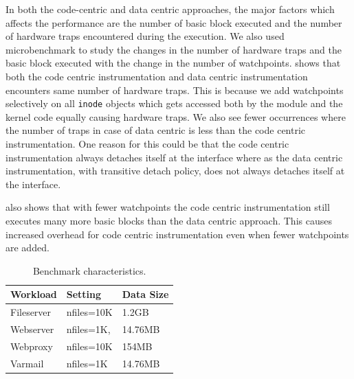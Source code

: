 In both the code-centric and data centric approaches, the major factors which affects the performance are the number of basic block executed and the number of hardware traps encountered during the execution. We also used microbenchmark to study the changes in the number of hardware traps and the basic block executed with the change in the number of watchpoints.  shows that both the code centric instrumentation and data centric instrumentation encounters same number of hardware traps. This is because we add watchpoints selectively on all \texttt{inode} objects which gets accessed both by the module and the kernel code equally causing hardware traps. We also see fewer occurrences where the number of traps in case of data centric is less than the code centric instrumentation. One reason for this could be that the code centric instrumentation always detaches itself at the interface where as the data centric instrumentation, with transitive detach policy, does not always detaches itself at the interface.

 also shows that with fewer watchpoints the code centric instrumentation still executes many more basic blocks than the data centric approach. This causes increased overhead for code centric instrumentation even when fewer watchpoints are added. 







\begin{table}
\begin{center}
\vspace{1em}
\begin{tabular}{|l|l|l|}
  \hline
   Workload & Setting & Data Size \\
  \hline
  Fileserver & nfiles=10K & 1.2GB \\
  \hline
  Webserver & nfiles=1K, & 14.76MB \\
  \hline
  Webproxy & nfiles=10K & 154MB \\
  \hline
  Varmail & nfiles=1K & 14.76MB \\
  \hline
\end{tabular}
\caption[Filebench server benchmark workload characteristics.]{\label{table:filebench-benchmark}Benchmark characteristics.}
\end{center}
\end{table}


